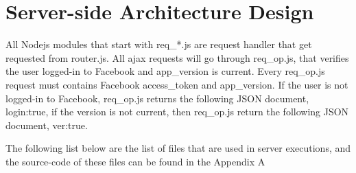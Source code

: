 \section{Server-side Architecture Design}

All Nodejs modules that start with req{\_}*.js are request handler that get requested from router.js. All ajax requests will go through req{\_}op.js, that verifies the user logged-in to Facebook and app{\_}version is current. Every req{\_}op.js request must contains Facebook access{\_}token and app{\_}version. If the user is not logged-in to Facebook, req{\_}op.js returns the following JSON document, {login:true}, if the version is not current, then req{\_}op.js return the following JSON document, {ver:true}. 

The following list below are the list of files that are used in server executions, and the source-code of these files can be found in the Appendix A

